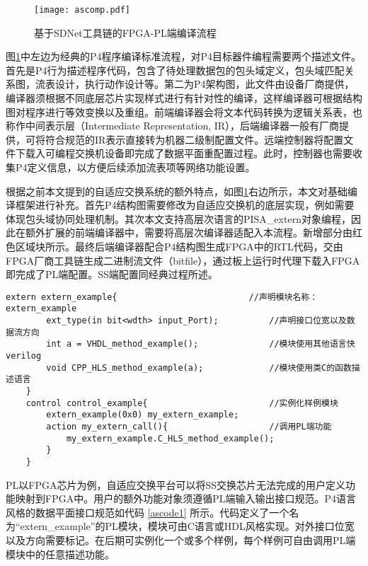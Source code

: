 \begin{figure}[!ht]
	\centering 
	\vspace{-1.5mm} 
	\texttt{[image: ascomp.pdf]}
	\caption{基于SDNet工具链的FPGA-PL端编译流程} \label{fig:ascomp}
\end{figure}

图\ref{fig:ascomp}中左边为经典的P4程序编译标准流程，对P4目标器件编程需要两个描述文件。首先是P4行为描述程序代码，包含了待处理数据包的包头域定义，包头域匹配关系图，流表设计，执行动作设计等。第二为P4架构图，此文件由设备厂商提供，编译器须根据不同底层芯片实现样式进行有针对性的编译，这样编译器可根据结构图对程序进行等效变换以及重组。前端编译器会将文本代码转换为逻辑关系表，也称作中间表示层（Intermediate Representation, IR），后端编译器一般有厂商提供，可将符合规范的IR表示直接转为机器二级制配置文件。远端控制器将配置文件下载入可编程交换机设备即完成了数据平面重配置过程。此时，控制器也需要收集P4定义信息，以方便后续添加流表项等网络功能设置。

根据之前本文提到的自适应交换系统的额外特点，如图\ref{fig:ascomp}右边所示，本文对基础编译框架进行补充。首先P4结构图需要修改为自适应交换机的底层实现，例如需要体现包头域协同处理机制。其次本文支持高层次语言的PISA\_extern对象编程，因此在额外扩展的前端编译器中，需要将高层次编译器适配入本流程。新增部分由红色区域块所示。最终后端编译器配合P4结构图生成FPGA中的RTL代码，交由FPGA厂商工具链生成二进制流文件（bitfile），通过板上运行时代理下载入FPGA即完成了PL端配置。SS端配置同经典过程所述。

\label{chap433}



{\fontsize{10pt}{0.5\baselineskip}\selectfont
	\begin{lstlisting}[caption={数据平面接口：PL端高层语言描述},label={ascode1}]
	extern extern_example{           				//声明模块名称：extern_example
		ext_type(in bit<wdth> input_Port);			//声明接口位宽以及数据流方向
		int a = VHDL_method_example();				//模块使用其他语言快verilog
		void CPP_HLS_method_example(a);				//模块使用类C的函数描述语言
	}
	control control_example{						//实例化样例模块
		extern_example(0x0) my_extern_example;
		action my_extern_call(){					//调用PL端功能
			my_extern_example.C_HLS_method_example();
		}
	}
	\end{lstlisting}
}

PL以FPGA芯片为例，自适应交换平台可以将SS交换芯片无法完成的用户定义功能映射到FPGA中。用户的额外功能对象须遵循PL端输入输出接口规范。P4语言风格的数据平面接口规范如代码 \ref{ascode1} 所示。代码定义了一个名为“extern\_example”的PL模块，模块可由C语言或HDL风格实现。对外接口位宽以及方向需要标记。在后期可实例化一个或多个样例，每个样例可自由调用PL端模块中的任意描述功能。

